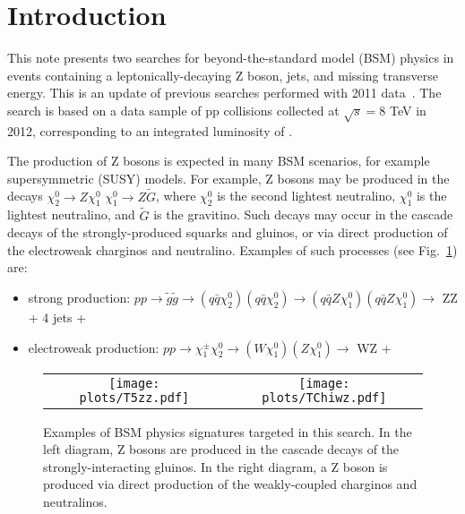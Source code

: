 \section{Introduction}
\label{ref:intro}

This note presents two searches for beyond-the-standard model (BSM) physics in events
containing a leptonically-decaying Z boson, jets, and missing transverse energy. This
is an update of previous searches performed with 2011 data~\cite{ref:Zpaper,ref:EWKPAS}.
The search is based on a data sample of pp collisions collected at $\sqrt{s}=8$ TeV in 2012,
corresponding to an integrated luminosity of \lumi.

The production of Z bosons is expected in many BSM scenarios, for example supersymmetric (SUSY)
models. For example, Z bosons may be produced in the decays $\chi^0_2\to Z \chi^0_1$ 
$\chi^0_1\to Z \tilde{G}$, where $\chi^0_2$ is the second lightest neutralino, $\chi^0_1$ is
the lightest neutralino, and $\tilde{G}$ is the gravitino. Such decays may occur in the cascade
decays of the strongly-produced squarks and gluinos, or via direct production of the electroweak
charginos and neutralino. Examples of such processes (see Fig.~\ref{fig:diagrams}) are:

\begin{itemize}
\item strong production:      $pp\to\tilde{g}\tilde{g}\to (q\bar{q}\chi^0_2) (q\bar{q}\chi^0_2)\to(q\bar{q}Z\chi^0_1) (q\bar{q}Z\chi^0_1)\to$ ZZ + 4 jets + \MET
\item electroweak production: $pp\to\chi^\pm_1\chi^0_2\to (W \chi^0_1)(Z \chi^0_1) \to$ WZ + \MET
\end{itemize}

\begin{figure}[!h]
\begin{center}
\begin{tabular}{cc}
\texttt{[image: plots/T5zz.pdf]} &
\texttt{[image: plots/TChiwz.pdf]} \\
\end{tabular}
\caption{
Examples of BSM physics signatures targeted in this search. In the left diagram, Z bosons are produced
in the cascade decays of the strongly-interacting gluinos. In the right diagram, a Z boson is produced
via direct production of the weakly-coupled charginos and neutralinos.
\label{fig:diagrams}
}
\end{center}
\end{figure}

